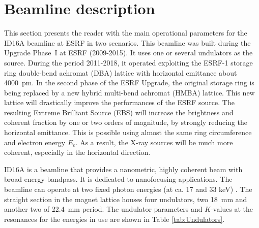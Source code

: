 \documentclass{iucr}              %
\newcommand{\inred}[1]{{\color{black}#1}}
\begin{document}

\section{Beamline description}
\label{Beamline description}

This section presents the reader with the main operational parameters for the ID16A beamline at ESRF \cite{ID16A} in two scenarios. This beamline was built during the Upgrade Phase~I at ESRF (2009-2015). It uses one or several undulators as the source. During the period 2011-2018, it operated exploiting the ESRF-1 storage ring double-bend achromat (DBA) lattice with horizontal emittance about 4000~pm. In the second phase of the ESRF Upgrade, the original storage ring is being replaced by a new hybrid multi-bend achromat (HMBA) lattice. This new lattice will drastically improve the performances of the ESRF source. The resulting Extreme Brilliant Source (EBS) \cite{orangebook} will increase the brightness and coherent fraction by \inred{one or two orders of magnitude}, by strongly reducing the horizontal emittance. This is possible using almost the same ring circumference and electron energy $E_e$. As a result, the X-ray sources will be much more coherent, especially in the horizontal direction.

ID16A is a beamline that provides a nanometric, highly coherent beam with broad energy-bandpass. It is dedicated to nanofocusing applications. The beamline can operate at two fixed photon energies \inred{(at ca. 17 and 33 keV) }. The straight section in the magnet lattice houses four undulators, two 18~mm and another two of 22.4~mm period. The undulator parameters and $K$-values at the resonances for the energies in use are shown in Table \ref{tab:Undulators}. 
\end{document}
